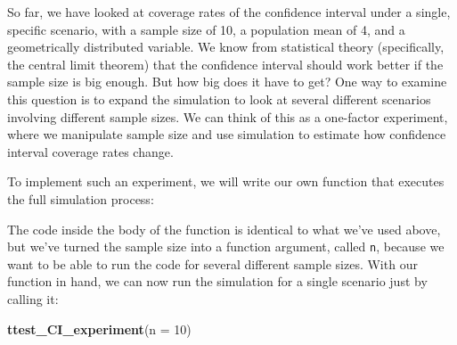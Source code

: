 \documentclass[
]{book}
\newenvironment{Shaded}{\begin{snugshade}}{\end{snugshade}}
\newcommand{\AttributeTok}[1]{\textcolor[rgb]{0.13,0.29,0.53}{#1}}
\newcommand{\CommentTok}[1]{\textcolor[rgb]{0.56,0.35,0.01}{\textit{#1}}}
\newcommand{\ControlFlowTok}[1]{\textcolor[rgb]{0.13,0.29,0.53}{\textbf{#1}}}
\newcommand{\DecValTok}[1]{\textcolor[rgb]{0.00,0.00,0.81}{#1}}
\newcommand{\FunctionTok}[1]{\textcolor[rgb]{0.13,0.29,0.53}{\textbf{#1}}}
\newcommand{\NormalTok}[1]{#1}
\newcommand{\OtherTok}[1]{\textcolor[rgb]{0.56,0.35,0.01}{#1}}
\newcommand{\SpecialCharTok}[1]{\textcolor[rgb]{0.81,0.36,0.00}{\textbf{#1}}}
\begin{document}
So far, we have looked at coverage rates of the confidence interval under a single, specific scenario, with a sample size of 10, a population mean of 4, and a geometrically distributed variable.
We know from statistical theory (specifically, the central limit theorem) that the confidence interval should work better if the sample size is big enough.
But how big does it have to get?
One way to examine this question is to expand the simulation to look at several different scenarios involving different sample sizes.
We can think of this as a one-factor experiment, where we manipulate sample size and use simulation to estimate how confidence interval coverage rates change.

To implement such an experiment, we will write our own function that executes the full simulation process:

\begin{Shaded}
\end{Shaded}

The code inside the body of the function is identical to what we've used above, but we've turned the sample size into a function argument, called \texttt{n}, because we want to be able to run the code for several different sample sizes.
With our function in hand, we can now run the simulation for a single scenario just by calling it:

\begin{Shaded}
\begin{Highlighting}[]
\FunctionTok{ttest\_CI\_experiment}\NormalTok{(}\AttributeTok{n =} \DecValTok{10}\NormalTok{)}
\end{Highlighting}
\end{Shaded}
\end{document}
